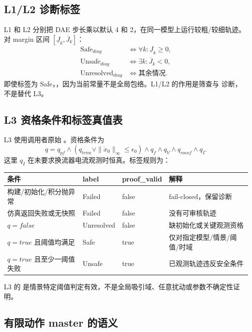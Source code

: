 \subsection{L1/L2 诊断标签}

L1 和 L2 分别把 DAE 步长乘以默认 4 和 2，在同一模型上运行较粗/较细轨迹。对 margin 区间
$[\underline J_k,\overline J_k]$：
\begin{align}
 \text{Safe}_{diag}&\iff \forall k:\underline J_k\ge0,\\
 \text{Unsafe}_{diag}&\iff \exists k:\overline J_k<0,\\
 \text{Unresolved}_{diag}&\iff\text{其余情况}.
\end{align}
即使标签为 Safe，，因为当前常量不是全局包络。L1/L2 的作用是筛查与
诊断，不是替代 L3。

\subsection{L3 资格条件和标签真值表}

L3 使用调用者原始 。资格条件为
\begin{equation}
 q= q_{pf}\land(q_{trim}\lor\|\dot x_0\|_\infty\le\epsilon_0)
 \land q_f\land q_V\land q_{rocof}\land q_I.
\end{equation}
这里 $q_I$ 在未要求换流器电流观测时恒真。标签规则为：
\begin{center}\small
\begin{tabular}{@{}L{3.0cm}L{3.2cm}L{2.4cm}L{5.0cm}@{}}
\toprule
条件 & label & proof\_valid & 解释\\\midrule
构建/初始化/积分抛异常 & Failed & false & fail-closed，保留诊断\\
仿真返回失败或无快照 & Failed & false & 没有可审核轨迹\\
$q=false$ & Unresolved & false & 缺初始化或关键观测资格\\
$q=true$ 且阈值均满足 & Safe & true & 仅对指定模型/情景/阈值/时域\\
$q=true$ 且至少一阈值失败 & Unsafe & true & 已观测轨迹违反安全条件\\
\bottomrule
\end{tabular}
\end{center}
L3 的  是情景特定阈值判定有效，不是全局吸引域、任意扰动或参数不确定性证明。

\subsection{有限动作 master 的语义}

